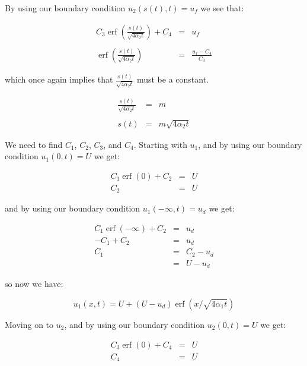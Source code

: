 \documentclass{report}
\DeclareMathOperator{\erf}{erf}
\begin{document}
By using our boundary condition $u_2(s(t), t) = u_f$ we see that:\bigskip

\begin{eqnarray*}
  C_3 \erf \left( \frac{s(t)}{\sqrt{4 \alpha_2 t}} \right) + C_4 & = & u_f \\\\
            \erf \left( \frac{s(t)}{\sqrt{4 \alpha_2 t}} \right) & = & \frac{u_f - C_4}{C_3}
\end{eqnarray*}\medskip

which once again implies that $\frac{s(t)}{\sqrt{4 \alpha_2 t}}$ must be a constant.\bigskip

\begin{eqnarray*}
  \frac{s(t)}{\sqrt{4 \alpha_2 t}} & = & m \\\\
                              s(t) & = & m \sqrt{4 \alpha_2 t}
\end{eqnarray*}\medskip



We need to find $C_1$, $C_2$, $C_3$, and $C_4$. Starting with $u_1$, and by using our boundary condition 
$u_1(0, t) = U$ we get:\bigskip

\begin{eqnarray*}
  C_1 \erf (0) + C_2 & = & U \\
                 C_2 & = & U
\end{eqnarray*}\medskip

and by using our boundary condition $u_1(-\infty, t) = u_d$ we get:\bigskip

\begin{eqnarray*}
  C_1 \erf (-\infty) + C_2 & = & u_d \\
                -C_1 + C_2 & = & u_d \\
                       C_1 & = &  C_2 - u_d \\
                           & = &  U - u_d 
\end{eqnarray*}\medskip

so now we have:\bigskip

\[ u_1(x, t) = U + (U - u_d) \erf ( x / \sqrt{4 \alpha_1 t} )  \]\medskip



Moving on to $u_2$, and by using our boundary condition $u_2(0, t) = U$ we get:\bigskip

\begin{eqnarray*}
  C_3 \erf (0) + C_4 & = & U \\
                 C_4 & = & U
\end{eqnarray*}\medskip
\end{document}

